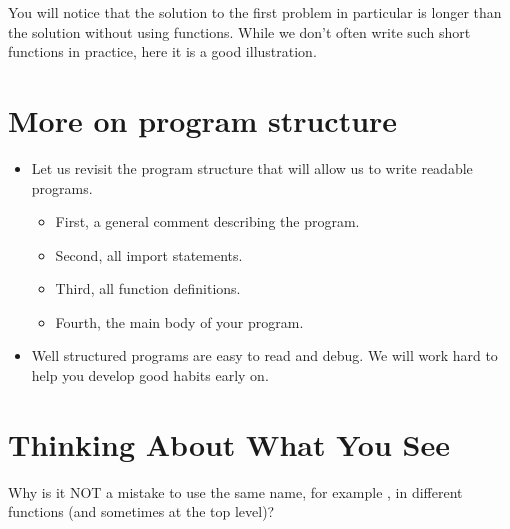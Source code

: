 \documentclass[letterpaper,10pt,english]{sphinxmanual}
\begin{document}
You will notice that the solution to the first problem in particular
is longer than the solution without using functions.  While we don’t
often write such short functions in practice, here it is a good
illustration.


\section{More on program structure}
\label{\detokenize{lecture_notes/lec05_functions2:more-on-program-structure}}\begin{itemize}
\item {} 
Let us revisit the program structure that will allow us to write
readable programs.
\begin{itemize}
\item {} 
First, a general comment describing the program.

\item {} 
Second, all import statements.

\item {} 
Third, all function definitions.

\item {} 
Fourth, the main body of your program.

\end{itemize}

\item {} 
Well structured programs are easy to read and debug. We will work
hard to help you develop good habits early on.

\end{itemize}


\section{Thinking About What You See}
\label{\detokenize{lecture_notes/lec05_functions2:thinking-about-what-you-see}}
Why is it NOT a mistake to use the same name, for example , in
different functions (and sometimes at the top level)?
\end{document}

